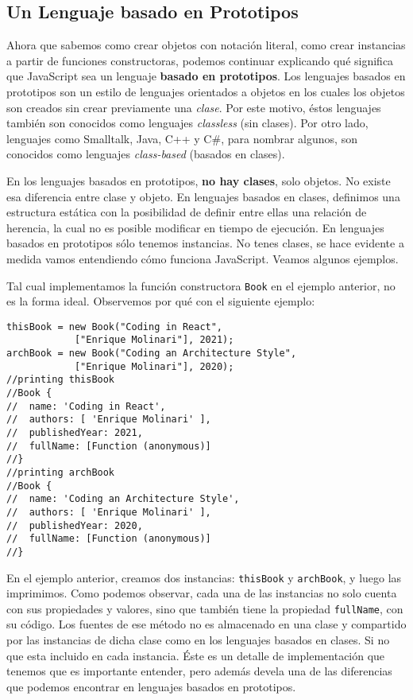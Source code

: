 \documentclass[a4paper, oneside, titlepage, 12pt]{paper}
\begin{document}
\subsection{Un Lenguaje basado en Prototipos}

Ahora que sabemos como crear objetos con notación literal, como crear instancias a partir de funciones constructoras, podemos continuar explicando qué significa que JavaScript sea un lenguaje \textbf{basado en prototipos}. Los lenguajes basados en prototipos son un estilo de lenguajes orientados a objetos en los cuales los objetos son creados sin crear previamente una \textit{clase}. Por este motivo, éstos lenguajes también son conocidos como lenguajes \textit{classless} (sin clases). Por otro lado, lenguajes como Smalltalk, Java, C++ y C\#, para nombrar algunos, son conocidos como lenguajes \textit{class-based} (basados en clases).
\newline

En los lenguajes basados en prototipos, \textbf{no hay clases}, solo objetos. No existe esa diferencia entre clase y objeto. En lenguajes basados en clases, definimos una estructura estática con la posibilidad de definir entre ellas una relación de herencia, la cual no es posible modificar en tiempo de ejecución. En lenguajes basados en prototipos sólo tenemos instancias. No tenes clases, se hace evidente a medida vamos entendiendo cómo funciona JavaScript. Veamos algunos ejemplos.
\newline

Tal cual implementamos la función constructora \texttt{Book} en el ejemplo anterior, no es la forma ideal. Observemos por qué con el siguiente ejemplo:

\begin{verbatim}
thisBook = new Book("Coding in React", 
			["Enrique Molinari"], 2021);
archBook = new Book("Coding an Architecture Style", 
			["Enrique Molinari"], 2020);
//printing thisBook
//Book {
//  name: 'Coding in React',
//  authors: [ 'Enrique Molinari' ],
//  publishedYear: 2021,
//  fullName: [Function (anonymous)]
//}
//printing archBook
//Book {
//  name: 'Coding an Architecture Style',
//  authors: [ 'Enrique Molinari' ],
//  publishedYear: 2020,
//  fullName: [Function (anonymous)]
//}
\end{verbatim}

En el ejemplo anterior, creamos dos instancias: \texttt{thisBook} y \texttt{archBook}, y luego las imprimimos. Como podemos observar, cada una de las instancias no solo cuenta con sus propiedades y valores, sino que también tiene la propiedad \texttt{fullName}, con su código. Los fuentes de ese método no es almacenado en una clase y compartido por las instancias de dicha clase como en los lenguajes basados en clases. Si no que esta incluido en cada instancia. Éste es un detalle de implementación que tenemos que es importante entender, pero además devela una de las diferencias que podemos encontrar en lenguajes basados en prototipos.
\newline
\end{document}
